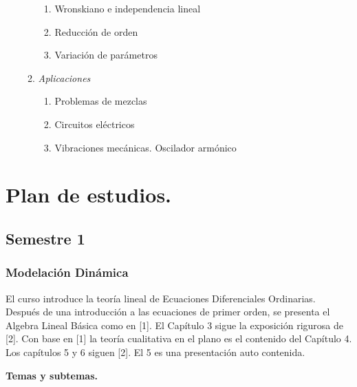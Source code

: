 \documentclass[10pt,a4paper]{article}
\begin{document}
\begin{enumerate}
\begin{enumerate}
\begin{enumerate}
			\item Wronskiano e independencia lineal
			\item Reducción de orden
			\item Variación de parámetros
		\end{enumerate}
		\item \textit{Aplicaciones}
		\begin{enumerate}
			\item Problemas de mezclas
			\item Circuitos eléctricos
			\item Vibraciones mecánicas. Oscilador armónico
		\end{enumerate}
	\end{enumerate}
\end{enumerate}
\newpage
\section{Plan de estudios.}
\subsection{Semestre 1}
\subsubsection{Modelación Dinámica}

El curso introduce la teoría lineal de Ecuaciones Diferenciales Ordinarias. Después
de una introducción a las ecuaciones de primer orden, se presenta el Algebra Lineal Básica como en [1]. El Capítulo 3 sigue la exposición rigurosa de [2]. Con base en [1] la teoría cualitativa en el plano es el contenido del Capítulo 4. Los capítulos 5 y 6 siguen [2]. El 5 es una presentación auto contenida.


\textbf{Temas y subtemas.}
\end{document}
